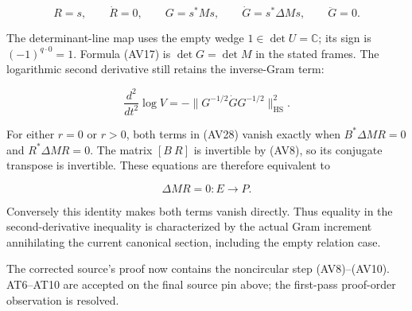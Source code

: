 \[
R=s,\qquad \dot R=0,\qquad
G=s^*Ms,\qquad \dot G=s^*\Delta M s,\qquad \ddot G=0.
\tag{AV30}
\]

The determinant-line map uses the empty wedge \(1\in\det U=\mathbb C\); its sign is \((-1)^{q\cdot0}=1\). Formula (AV17) is \(\det G=\det M\) in the stated frames. The logarithmic second derivative still retains the inverse-Gram term:

\[
\frac{d^2}{dt^2}\log V
=-\|G^{-1/2}\dot G G^{-1/2}\|_{\mathrm{HS}}^2.
\tag{AV31}
\]

For either \(r=0\) or \(r>0\), both terms in (AV28) vanish exactly when \(B^*\Delta M R=0\) and \(R^*\Delta M R=0\). The matrix \([B\ R]\) is invertible by (AV8), so its conjugate transpose is invertible. These equations are therefore equivalent to

\[
\Delta M R=0:E\longrightarrow P.
\tag{AV32}
\]

Conversely this identity makes both terms vanish directly. Thus equality in the second-derivative inequality is characterized by the actual Gram increment annihilating the current canonical section, including the empty relation case.

The corrected source's proof now contains the noncircular step (AV8)--(AV10). AT6--AT10 are accepted on the final source pin above; the first-pass proof-order observation is resolved.

\endgroup


\endgroup
